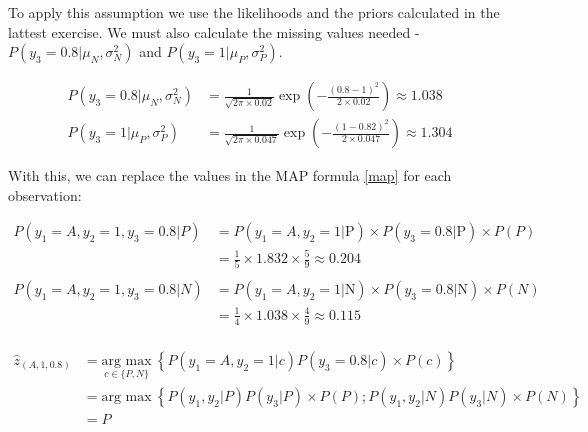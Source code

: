\documentclass[12pt]{article}
\begin{document}
\begin{enumerate}[leftmargin=\labelsep]
    \vspace{10pt}
    To apply this assumption we use the likelihoods and the priors calculated in the lattest exercise.
    We must also calculate the missing values needed - $P(y_3 = 0.8|\mu_N, \sigma_N^2)$ and $P(y_3 = 1|\mu_P, \sigma_P^2)$.

    \begin{equation*}
        \begin{aligned}
            P(y_3 = 0.8|\mu_N, \sigma_N^2) &= \frac{1}{\sqrt{2\pi \times 0.02}} \exp\left(-\frac{(0.8 - 1)^2}{2 \times 0.02}\right) \approx 1.038\\
            P(y_3 = 1|\mu_P, \sigma_P^2) &= \frac{1}{\sqrt{2\pi \times 0.047}} \exp\left(-\frac{(1 - 0.82)^2}{2 \times 0.047}\right) \approx 1.304
        \end{aligned}
    \end{equation*}

    \vspace{10pt}
    With this, we can replace the values in the MAP formula \eqref{map} for each observation:

    \vspace{10pt}
    \begin{equation*}
        \begin{aligned}
        P(y_1 = A, y_2 = 1, y_3 = 0.8 | P) &= P(y_1 = A, y_2 = 1 | \text{P}) \times P(y_3 = 0.8 | \text{P}) \times P(P) \\
        &= \frac{1}{5} \times 1.832 \times \frac{5}{9} \approx 0.204\\
        \\
        P(y_1 = A, y_2 = 1, y_3 = 0.8 | N) &= P(y_1 = A, y_2 = 1 | \text{N}) \times P(y_3 = 0.8 | \text{N}) \times P(N) \\
        &= \frac{1}{4} \times 1.038 \times \frac{4}{9} \approx 0.115\\
        \end{aligned}
    \end{equation*}

    \begin{equation*}
    \begin{aligned}
        \hat{z}_{(A, 1, 0.8)} &= \underset{c \in \{P,N\}}{\text{arg max}} \medspace \left\{P(y_1 = A, y_2 = 1 | c) P(y_3 = 0.8| c) \times P(c)\right\}\\
                    & = \text{arg max} \medspace \left\{P(y_1, y_2 | P) P(y_3| P) \times P(P); P(y_1, y_2 | N) P(y_3| N) \times P(N)\right\} \\
                    & = P
    \end{aligned}
    \end{equation*}


\end{enumerate}
\end{document}
